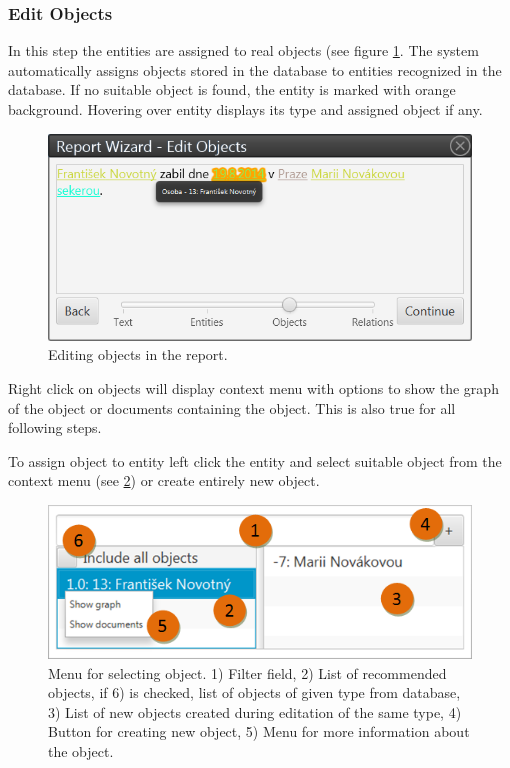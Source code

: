 \documentclass[12pt,a4paper]{report}
\begin{document}
\subsubsection{Edit Objects}
\label{sssec:EditObjects}

In this step the entities are assigned to real objects (see figure
\ref{fig:Objects}. The system automatically assigns objects stored in the
database to entities recognized in the database. If no suitable object is
found, the entity is marked with orange background. Hovering over entity
displays its type and assigned object if any.

\begin{figure}[!htb]
        \centering
        \includegraphics[width=\textwidth]{Images/objects}
        \caption{Editing objects in the report.}
        \label{fig:Objects}
\end{figure}

Right click on objects will display context menu with options to show the graph
of the object or documents containing the object. This is also true for all following steps.

To assign object to entity left click the entity and select suitable object
from the context menu (see \ref{fig:ObjectMenu}) or create entirely new object.

\begin{figure}[!htb]
        \centering
        \includegraphics[width=\textwidth]{Images/objectmenu}
        \caption{Menu for selecting object. 1) Filter field, 2) List of recommended
		 objects, if 6) is checked, list of objects of given type from database,
		 3) List of new objects created during editation of the same type,
		 4) Button for creating new object, 5) Menu for more information about
		 the object.}
        \label{fig:ObjectMenu}
\end{figure}
\end{document}
